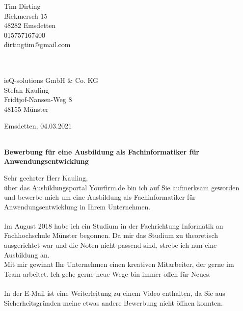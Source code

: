 \documentclass[12pt,twoside,a4paper]{scrlttr2}
\begin{document}
	
	\begin{letter}
		
			\begin{flushright}
				Tim Dirting \\
				Biekmersch 15\\ 
				48282 Emsdetten \\
				015757167400 \\
				dirtingtim@gmail.com\\  
				  \, \\
				  \, \\
			\end{flushright}
		
			\begin{flushleft}
				
			ieQ-solutions GmbH \& Co. KG \\  
			Stefan Kauling\\  
			Fridtjof-Nansen-Weg 8\\  
			48155 M\"unster\\  
			
			
	
			\end{flushleft}
	
			\begin{flushright}
			Emsdetten, 04.03.2021\\
			\end{flushright}

			\textbf{ \\ Bewerbung f\"ur eine Ausbildung als Fachinformatiker f\"ur Anwendungsentwicklung}

			\begin{flushleft}
			Sehr geehrter Herr Kauling,\\
				
			 
			über das Ausbildungsportal Yourfirm.de bin ich auf Sie aufmerksam geworden und bewerbe mich um eine Ausbildung als Fachinformatiker für Anwendungsentwicklung in Ihrem Unternehmen. \\
			
		    \, \\	
			Im August 2018 habe ich ein Studium in der Fachrichtung Informatik an Fachhochschule Münster begonnen. Da mir das Studium zu theoretisch ausgerichtet war und die Noten nicht passend sind, strebe ich nun eine Ausbildung an.		\\	
			Mit mir gewinnt Ihr Unternehmen einen kreativen Mitarbeiter, der gerne im Team arbeitet. Ich gehe gerne neue Wege bin immer offen für Neues.\\
			\,\\
		In der E-Mail ist eine Weiterleitung zu einem Video enthalten, da Sie aus Sicherheitsgr\"unden
		meine etwas andere Bewerbung nicht \"offnen konnten.
	

\end{flushleft}
\end{letter}
\end{document}
